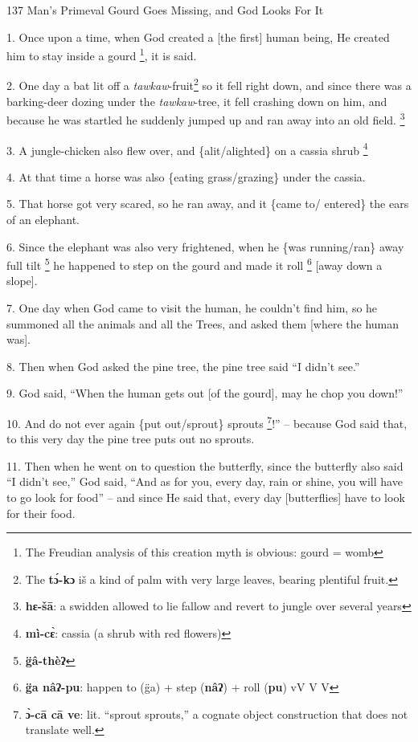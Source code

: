 
137 Man's Primeval Gourd Goes Missing, and God Looks For It

1. Once upon a time, when God created a [the first] human being, He created him
to stay inside a gourd \footnote{The Freudian analysis of this creation myth is obvious: gourd = womb}, it is said.

2. One day a bat lit off a \textit{tawkaw}-fruit\footnote{The \textbf{tɔ́-kɔ} iš a kind of palm with very large leaves, bearing plentiful fruit.} so it fell right down, and
since there was a barking-deer dozing under the \textit{tawkaw}-tree, it fell crashing
down on him, and because he was startled he suddenly jumped up and ran away into
an old field. \footnote{\textbf{hɛ-šā}: a swidden allowed to lie fallow and revert to jungle over several years}

3. A jungle-chicken also flew over, and \{alit/alighted\} on a cassia shrub \footnote{\textbf{mì-cɛ̀}: cassia (a shrub with red flowers)}

4. At that time a horse was also \{eating grass/grazing\} under the cassia.

5. That horse got very scared, so he ran away, and it \{came to/ entered\} the
ears of an elephant.

6. Since the elephant was also very frightened, when he \{was running/ran\} away
full tilt \footnote{\textbf{g̈â-thèʔ}} he happened to step on the gourd and made it roll \footnote{\textbf{g̈a nâʔ-pu}: happen to (g̈a) + step (\textbf{nâʔ}) + roll (\textbf{pu})   vV V    V} [away down
a slope].

7. One day when God came to visit the human, he couldn't find him, so he summoned
all the animals and all the Trees, and asked them [where the human was].

8. Then when God asked the pine tree, the pine tree said ``I didn't see.''

9. God said, ``When the human gets out [of the gourd], may he chop you down!''

10. And do not ever again \{put out/sprout\} sprouts \footnote{\textbf{ɔ̀-cā cā ve}: lit. ``sprout sprouts,'' a cognate object construction that does not translate well.}!'' -- because God said
that, to this very day the pine tree puts out no sprouts.

11. Then when he went on to question the butterfly, since the butterfly also said
``I didn't see,'' God said, ``And as for you, every day, rain or shine, you will
have to go look for food'' -- and since He said that, every day [butterflies] have
to look for their food.

